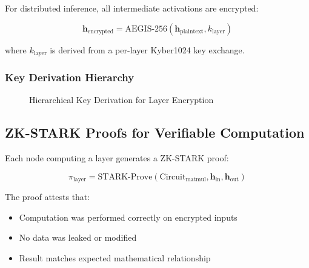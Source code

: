 \documentclass[11pt,a4paper]{article}
\newcommand{\vect}[1]{\mathbf{#1}}
\begin{document}
For distributed inference, all intermediate activations are encrypted:

\begin{equation}
\vect{h}_{\text{encrypted}} = \text{AEGIS-256}(\vect{h}_{\text{plaintext}}, k_{\text{layer}})
\label{eq:tensor-encryption}
\end{equation}

where $k_{\text{layer}}$ is derived from a per-layer Kyber1024 key exchange.

\subsubsection{Key Derivation Hierarchy}

\begin{figure}[H]
\centering
{}
\caption{Hierarchical Key Derivation for Layer Encryption}
\end{figure}

\subsection{ZK-STARK Proofs for Verifiable Computation}

Each node computing a layer generates a ZK-STARK proof:

\begin{equation}
\pi_{\text{layer}} = \text{STARK-Prove}(\text{Circuit}_{\text{matmul}}, \vect{h}_{\text{in}}, \vect{h}_{\text{out}})
\end{equation}

The proof attests that:
\begin{itemize}
    \item Computation was performed correctly on encrypted inputs
    \item No data was leaked or modified
    \item Result matches expected mathematical relationship
\end{itemize}
\end{document}
